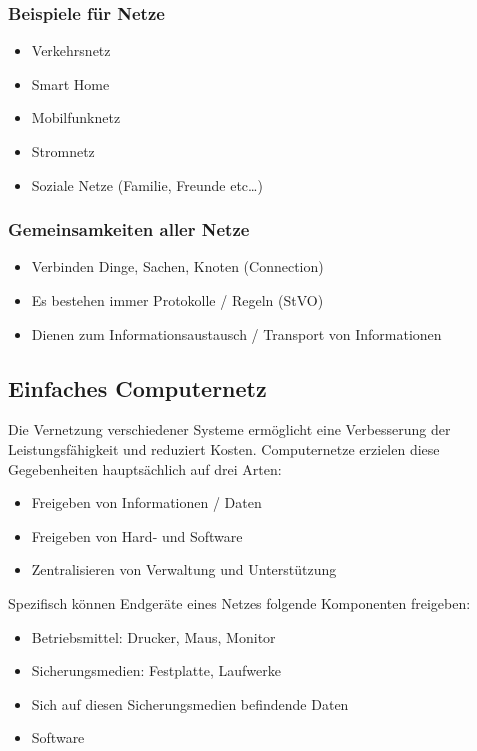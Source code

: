 \documentclass[12pt,a4paper]{article}
\begin{document}
\subsubsection{Beispiele für Netze}
\begin{itemize}
\item Verkehrsnetz
\item Smart Home
\item Mobilfunknetz
\item Stromnetz
\item Soziale Netze (Familie, Freunde etc\dots)
\end{itemize}
\subsubsection{Gemeinsamkeiten aller Netze}
\begin{itemize}
\item Verbinden Dinge, Sachen, Knoten (Connection)
\item Es bestehen immer Protokolle / Regeln (StVO)
\item Dienen zum Informationsaustausch / Transport von Informationen
\end{itemize}
\subsection{Einfaches Computernetz}
\begin{figure}[h]
\centering
{}
\end{figure}
\noindent Die Vernetzung verschiedener Systeme ermöglicht eine Verbesserung der Leistungsfähigkeit und reduziert Kosten. Computernetze erzielen diese Gegebenheiten hauptsächlich auf drei Arten:
\begin{itemize}
\item Freigeben von Informationen / Daten
\item Freigeben von Hard- und Software
\item Zentralisieren von Verwaltung und Unterstützung
\end{itemize}
Spezifisch können Endgeräte eines Netzes folgende Komponenten freigeben:
\begin{itemize}
\item Betriebsmittel: Drucker, Maus, Monitor
\item Sicherungsmedien: Festplatte, Laufwerke
\item Sich auf diesen Sicherungsmedien befindende Daten
\item Software
\end{itemize}
\end{document}
